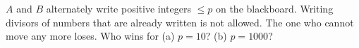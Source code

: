 $A$ and $B$ alternately write positive integers $\leq p$ on the blackboard. Writing divisors of numbers that are already written is not allowed. The one who cannot move any more loses. Who wins for (a) $p = 10$? (b) $p = 1000$?
